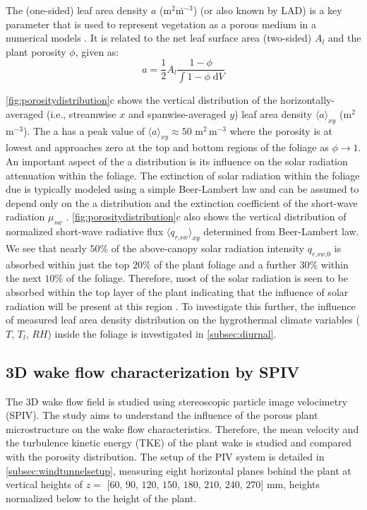 The (one-sided) leaf area density $a$ (m$^2$\.m$^{-3}$) (or also known by LAD) is a key parameter that is used to represent vegetation as a porous medium in a numerical models \citep{DeLangre2008,Gross1987,Manickathan2018a}. It is related to the net leaf surface area (two-sided) $A_l$ and the plant porosity $\phi$, given as:
\begin{equation}
a = \frac{1}{2}{A_l}\frac{{1 - \phi }}{{\int {1 - \phi \;{\mathrm{d}}V} }}
\end{equation}

\cref{fig:porositydistribution}c shows the vertical distribution of the horizontally-averaged (i.e., streamwise $x$ and spanwise-averaged $y$) leaf area density $\langle a \rangle_{\textit{xy}}$ (m$^2$\,m$^{-3}$). The a has a peak value of $\langle a \rangle_{\textit{xy}}\approx50$ m$^2$\,m$^{-3}$ where the porosity is at lowest and approaches zero at the top and bottom regions of the foliage as $\phi\rightarrow1$. An important aspect of the a distribution is its influence on the solar radiation attenuation within the foliage. The extinction of solar radiation within the foliage due is typically modeled using a simple Beer-Lambert law and can be assumed to depend only on the a distribution and the extinction coefficient of the short-wave radiation $\mu_{\textit{sw}}$ \citep{Manickathan2018a}. \cref{fig:porositydistribution}c also shows the vertical distribution of normalized short-wave radiative flux $\langle q_{\textit{r,sw}} \rangle_{\textit{xy}}$ determined from Beer-Lambert law. We see that nearly $50\%$ of the above-canopy solar radiation intensity $q_{\textit{r,sw,0}}$ is absorbed within just the top $20\%$ of the plant foliage and a further $30\%$ within the next $10\%$ of the foliage. Therefore, most of the solar radiation is seen to be absorbed within the top layer of the plant indicating that the influence of solar radiation will be present at this region \citep{Manickathan2018a}. To investigate this further, the influence of measured leaf area density distribution on the hygrothermal climate variables ($T$, $T_l$, $\textit{RH}$) inside the foliage is investigated in \cref{subsec:diurnal}.


\subsection{3D wake flow characterization by SPIV}
\label{subsec:stereopiv}

The 3D wake flow field is studied using stereoscopic particle image velocimetry (SPIV). The study aims to understand the influence of the porous plant microstructure on the wake flow characteristics. Therefore, the mean velocity and the turbulence kinetic energy (TKE) of the plant wake is studied and compared with the porosity distribution. The setup of the PIV system is detailed in \cref{subsec:windtunnelsetup}, measuring eight horizontal planes behind the plant at vertical heights of $z =$ $[60$, $90$, $120$, $150$, $180$, $210$, $240$, $270]$ mm, heights normalized below to the height of the plant.

